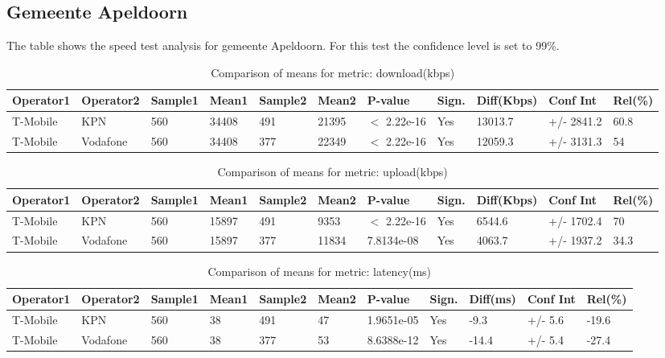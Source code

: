 \documentclass[]{article}
\begin{document}
\normalsize

\newpage

\subsection{Gemeente Apeldoorn}\label{gemeente-apeldoorn}

The table shows the speed test analysis for gemeente Apeldoorn. For this
test the confidence level is set to 99\%.

\begin{table}[ht]
\centering
{\footnotesize
\begin{tabular}{lllllllllll}
  \hline
Operator1 & Operator2 & Sample1 & Mean1 & Sample2 & Mean2 & P-value & Sign. & Diff(Kbps) & Conf Int & Rel(\%) \\ 
  \hline
T-Mobile & KPN & 560 & 34408 & 491 & 21395 & $<$ 2.22e-16 & Yes & 13013.7 & +/- 2841.2 & 60.8 \\ 
  T-Mobile & Vodafone & 560 & 34408 & 377 & 22349 & $<$ 2.22e-16 & Yes & 12059.3 & +/- 3131.3 & 54 \\ 
   \hline
\end{tabular}
}
\caption{Comparison of means for metric: download(kbps)} 
\end{table}

\begin{table}[ht]
\centering
{\footnotesize
\begin{tabular}{lllllllllll}
  \hline
Operator1 & Operator2 & Sample1 & Mean1 & Sample2 & Mean2 & P-value & Sign. & Diff(Kbps) & Conf Int & Rel(\%) \\ 
  \hline
T-Mobile & KPN & 560 & 15897 & 491 & 9353 & $<$ 2.22e-16 & Yes & 6544.6 & +/- 1702.4 & 70 \\ 
  T-Mobile & Vodafone & 560 & 15897 & 377 & 11834 & 7.8134e-08 & Yes & 4063.7 & +/- 1937.2 & 34.3 \\ 
   \hline
\end{tabular}
}
\caption{Comparison of means for metric: upload(kbps)} 
\end{table}

\begin{table}[ht]
\centering
{\footnotesize
\begin{tabular}{lllllllllll}
  \hline
Operator1 & Operator2 & Sample1 & Mean1 & Sample2 & Mean2 & P-value & Sign. & Diff(ms) & Conf Int & Rel(\%) \\ 
  \hline
T-Mobile & KPN & 560 & 38 & 491 & 47 & 1.9651e-05 & Yes & -9.3 & +/- 5.6 & -19.6 \\ 
  T-Mobile & Vodafone & 560 & 38 & 377 & 53 & 8.6388e-12 & Yes & -14.4 & +/- 5.4 & -27.4 \\ 
   \hline
\end{tabular}
}
\caption{Comparison of means for metric: latency(ms)} 
\end{table}
\end{document}
